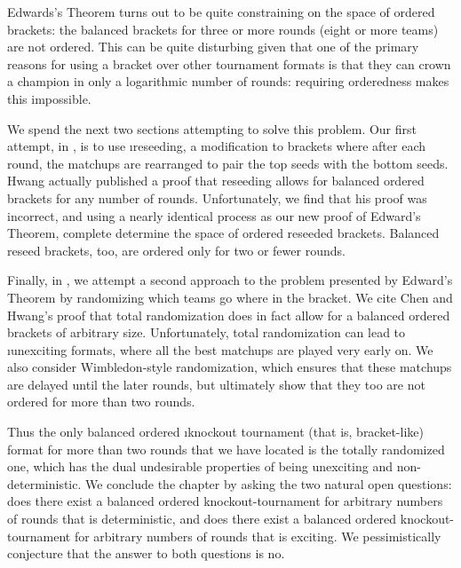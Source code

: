{    Edwards's Theorem turns out to be quite constraining on the space of ordered brackets: the balanced brackets for three or more rounds (eight or more teams) are not ordered. This can be quite disturbing given that one of the primary reasons for using a bracket over other tournament formats is that they can crown a champion in only a logarithmic number of rounds: requiring orderedness makes this impossible. 

    We spend the next two sections attempting to solve this problem. Our first attempt, in , is to use \i{reseeding}, a modification to brackets where after each round, the matchups are rearranged to pair the top seeds with the bottom seeds. Hwang \cite{reseeding} actually published a proof that reseeding allows for balanced ordered brackets for any number of rounds. Unfortunately, we find that his proof was incorrect, and using a nearly identical process as our new proof of Edward's Theorem, complete determine the space of ordered reseeded brackets. Balanced reseed brackets, too, are ordered only for two or fewer rounds.

    Finally, in , we attempt a second approach to the problem presented by Edward's Theorem by randomizing which teams go where in the bracket. We cite Chen and Hwang's \cite{totally_random_balanced} proof that total randomization does in fact allow for a balanced ordered brackets of arbitrary size. Unfortunately, total randomization can lead to \i{unexciting} formats, where all the best matchups are played very early on. We also consider Wimbledon-style randomization, which ensures that these matchups are delayed until the later rounds, but ultimately show that they too are not ordered for more than two rounds.

    Thus the only balanced ordered \i{knockout tournament} (that is, bracket-like) format for more than two rounds that we have located is the totally randomized one, which has the dual undesirable properties of being unexciting and non-deterministic. We conclude the chapter by asking the two natural open questions: does there exist a balanced ordered knockout-tournament for arbitrary numbers of rounds that is deterministic, and does there exist a balanced ordered knockout-tournament for arbitrary numbers of rounds that is exciting. We pessimistically conjecture that the answer to both questions is no.

    








}